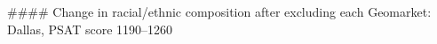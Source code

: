 #### Change in racial/ethnic composition after excluding each Geomarket: Dallas, PSAT score 1190–1260
